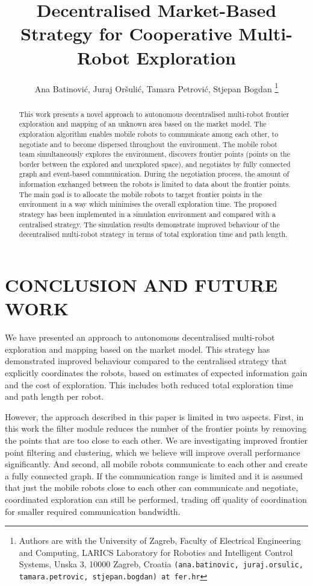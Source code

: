 \documentclass[letterpaper, 10 pt, conference]{ieeeconf}  %
\title{\LARGE \bf
Decentralised Market-Based Strategy for Cooperative Multi-Robot Exploration 
}
\author{Ana Batinovi\'{c}, Juraj Or\v{s}uli\'{c}, Tamara Petrovi\'{c}, Stjepan Bogdan
	\thanks{Authors are with the University of Zagreb, Faculty of Electrical Engineering  and Computing, LARICS Laboratory for Robotics and Intelligent Control Systems, Unska 3, 10000 Zagreb, Croatia
        {\tt\small (ana.batinovic, juraj.orsulic, tamara.petrovic, stjepan.bogdan) at fer.hr}}}
\begin{document}
\maketitle

\thispagestyle{empty}
\pagestyle{empty}


\begin{abstract}

This work presents a novel approach to autonomous decentralised multi-robot frontier exploration and mapping of an unknown area based on the market model. The exploration algorithm enables mobile robots to communicate among each other, to negotiate and to become dispersed throughout the environment. The mobile robot team simultaneously explores the environment, discovers frontier points (points on the border between the explored and unexplored space), and negotiates by fully connected graph and event-based communication. During the negotiation process, the amount of information exchanged between the robots is limited to data about the frontier points. The main goal is to allocate the mobile robots to target frontier points in the environment in a way which minimises the overall exploration time. The proposed strategy has been implemented in a simulation environment and compared with a centralised strategy. The simulation results demonstrate improved behaviour of the decentralised multi-robot strategy in terms of total exploration time and path length. 

\end{abstract}





\section{CONCLUSION AND FUTURE WORK}
We have presented an approach to autonomous decentralised multi-robot exploration and mapping based on the market model. This strategy has demonstrated improved behaviour compared to the centralised strategy that explicitly coordinates the robots, based on estimates of expected information gain and the cost of exploration. This includes both reduced total exploration time and path length per robot.

However, the approach described in this paper is limited in two aspects. First, in this work the filter module reduces the number of the frontier points by removing the points that are too close to each other. We are investigating improved frontier point filtering and clustering, which we believe will improve overall performance significantly. And second, all mobile robots communicate to each other and create a fully connected graph. If the communication range is limited and it is assumed that just the mobile robots close to each other can communicate and negotiate, coordinated exploration can still be performed, trading off quality of coordination for smaller required communication bandwidth.
\end{document}
